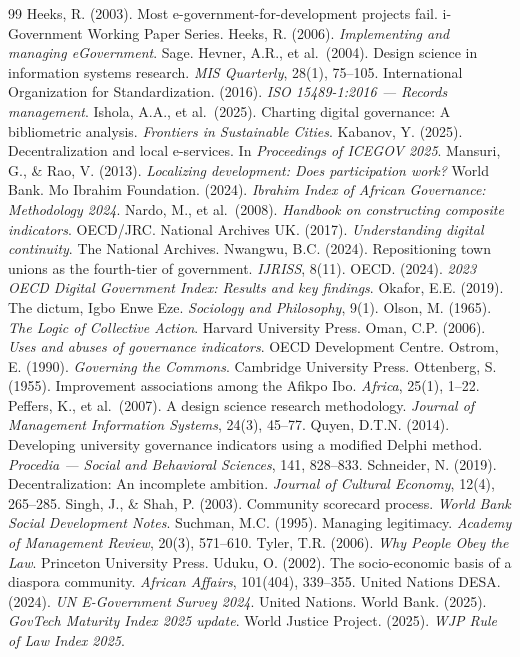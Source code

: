 \documentclass[sigconf]{acmart}
\begin{document}
\begin{thebibliography}{99}
 Heeks, R. (2003). Most e-government-for-development projects fail. i-Government Working Paper Series.
 Heeks, R. (2006). \textit{Implementing and managing eGovernment}. Sage.
 Hevner, A.R., et al.\ (2004). Design science in information systems research. \textit{MIS Quarterly}, 28(1), 75--105.
 International Organization for Standardization. (2016). \textit{ISO 15489-1:2016 --- Records management}.
 Ishola, A.A., et al.\ (2025). Charting digital governance: A bibliometric analysis. \textit{Frontiers in Sustainable Cities}.
 Kabanov, Y. (2025). Decentralization and local e-services. In \textit{Proceedings of ICEGOV 2025}.
 Mansuri, G., \& Rao, V. (2013). \textit{Localizing development: Does participation work?} World Bank.
 Mo Ibrahim Foundation. (2024). \textit{Ibrahim Index of African Governance: Methodology 2024}.
 Nardo, M., et al.\ (2008). \textit{Handbook on constructing composite indicators}. OECD/JRC.
 National Archives UK. (2017). \textit{Understanding digital continuity}. The National Archives.
 Nwangwu, B.C. (2024). Repositioning town unions as the fourth-tier of government. \textit{IJRISS}, 8(11).
 OECD. (2024). \textit{2023 OECD Digital Government Index: Results and key findings}.
 Okafor, E.E. (2019). The dictum, Igbo Enwe Eze. \textit{Sociology and Philosophy}, 9(1).
 Olson, M. (1965). \textit{The Logic of Collective Action}. Harvard University Press.
 Oman, C.P. (2006). \textit{Uses and abuses of governance indicators}. OECD Development Centre.
 Ostrom, E. (1990). \textit{Governing the Commons}. Cambridge University Press.
 Ottenberg, S. (1955). Improvement associations among the Afikpo Ibo. \textit{Africa}, 25(1), 1--22.
 Peffers, K., et al.\ (2007). A design science research methodology. \textit{Journal of Management Information Systems}, 24(3), 45--77.
 Quyen, D.T.N. (2014). Developing university governance indicators using a modified Delphi method. \textit{Procedia --- Social and Behavioral Sciences}, 141, 828--833.
 Schneider, N. (2019). Decentralization: An incomplete ambition. \textit{Journal of Cultural Economy}, 12(4), 265--285.
 Singh, J., \& Shah, P. (2003). Community scorecard process. \textit{World Bank Social Development Notes}.
 Suchman, M.C. (1995). Managing legitimacy. \textit{Academy of Management Review}, 20(3), 571--610.
 Tyler, T.R. (2006). \textit{Why People Obey the Law}. Princeton University Press.
 Uduku, O. (2002). The socio-economic basis of a diaspora community. \textit{African Affairs}, 101(404), 339--355.
 United Nations DESA. (2024). \textit{UN E-Government Survey 2024}. United Nations.
 World Bank. (2025). \textit{GovTech Maturity Index 2025 update}.
 World Justice Project. (2025). \textit{WJP Rule of Law Index 2025}.

\end{thebibliography}
\end{document}
